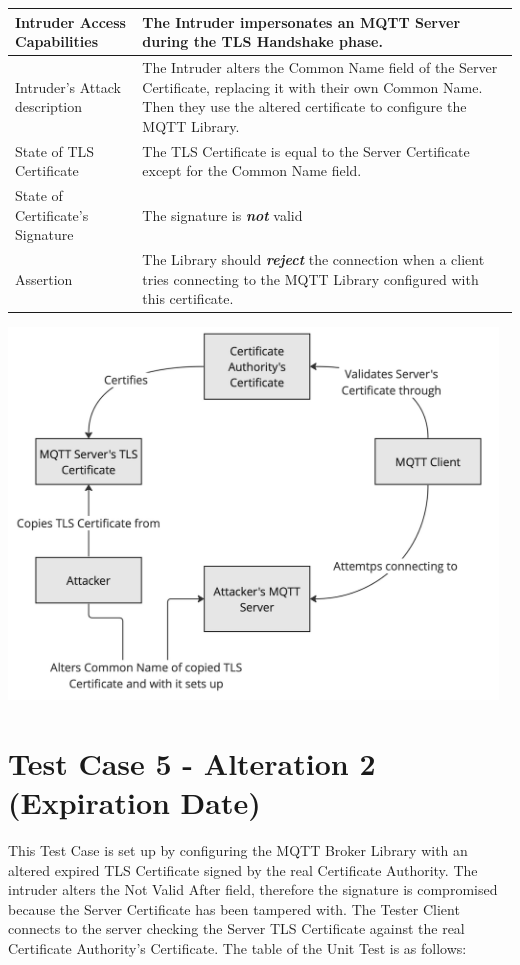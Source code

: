 \documentclass[binding=0.6cm,noexaminfo]{sapthesis}
\begin{document}
\begin{center}
\begin{tabular}{| p{6cm} | p{6cm} |}
\hline
Intruder Access Capabilities & The Intruder impersonates an MQTT Server during the TLS Handshake phase. \\
\hline
Intruder’s Attack description & The Intruder alters the Common Name field of the Server Certificate, replacing it with their own Common Name. Then they use the altered certificate to configure the MQTT Library. \\
\hline
State of TLS Certificate & The TLS Certificate is equal to the Server Certificate except for the Common Name field. \\
\hline
State of Certificate’s Signature & The signature is \textbf{\textit{not}} valid \\
\hline
Assertion & The Library should \textbf{\textit{reject}} the connection when a client tries connecting to the MQTT Library configured with this certificate. \\
\hline
\end{tabular}
\end{center}

\includegraphics[width=13cm]{TC4}

\section{Test Case 5 - Alteration 2 (Expiration Date)}
This Test Case is set up by configuring the MQTT Broker Library with an altered expired TLS Certificate signed by the real Certificate Authority. The intruder alters the Not Valid After field, therefore the signature is compromised because the Server Certificate has been tampered with. The Tester Client connects to the server checking the Server TLS Certificate against the real Certificate Authority’s Certificate. The table of the Unit Test is as follows:
\end{document}
